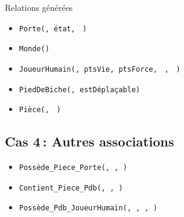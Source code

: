 Relations générées
\begin{itemize}
  \item \texttt{Porte(}\texttt{, état, }
        \textcolor{vert}{}\texttt{)}  
  \item \texttt{Monde(}\texttt{)}  
  \item \texttt{JoueurHumain(}\texttt{, ptsVie, ptsForce, }
        \textcolor{vert}{}\texttt{, }
        \textcolor{vert}{}\texttt{)}  
  \item \texttt{PiedDeBiche(}\texttt{, estDéplaçable)}  
  \item \texttt{Pièce(}\texttt{, }
        \textcolor{vert}{}\texttt{)}  
\end{itemize}

\subsection{Cas 4 : Autres associations}
\begin{itemize}
  \item \texttt{Possède\_Piece\_Porte(}\texttt{, }\texttt{, }\texttt{)}  
  \item \texttt{Contient\_Piece\_Pdb(}\texttt{, }\texttt{, }\texttt{)}  
  \item \texttt{Possède\_Pdb\_JoueurHumain(}\texttt{, }\texttt{, }\texttt{, }\texttt{)}  
\end{itemize}

\normalsize

